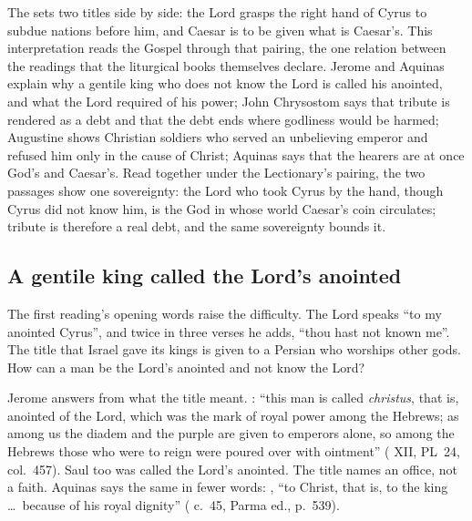 \label{sec:cyrus-and-caesar}

The  sets two titles side by side: the Lord grasps the right hand of
Cyrus to subdue nations before him, and Caesar is to be given what is
Caesar's. This interpretation reads the Gospel through that pairing, the one
relation between the readings that the liturgical books themselves declare.
Jerome and Aquinas explain why a gentile king who does not know the Lord is
called his anointed, and what the Lord required of his power; John Chrysostom says that tribute is
rendered as a debt and that the debt ends where godliness would be harmed;
Augustine shows Christian soldiers who served an unbelieving emperor and
refused him only in the cause of Christ; Aquinas says that the hearers are at
once God's and Caesar's. Read together under the Lectionary's pairing, the
two passages show one sovereignty: the Lord who took Cyrus by the hand, though
Cyrus did not know him, is the God in whose world Caesar's coin circulates;
tribute is therefore a real debt, and the same sovereignty bounds it.

\subsection{A gentile king called the Lord's anointed}

The first reading's opening words raise the difficulty. The Lord speaks ``to
my anointed Cyrus'', and twice in three verses he adds, ``thou hast not known
me''. The title that Israel gave its kings is given to a Persian who worships
other gods. How can a man be the Lord's anointed and not know the Lord?

Jerome answers from what the title meant. : ``this man is called
\emph{christus}, that is, anointed of the Lord, which was the mark of royal
power among the Hebrews; as among us the diadem and the purple are given to
emperors alone, so among the Hebrews those who were to reign were poured over
with ointment'' ( XII, PL~24, col.~457). Saul too
was called the Lord's anointed. The title names an office, not a faith. Aquinas
says the same in fewer words: , ``to Christ, that is, to the king \ldots\ because of his
royal dignity'' ( c.~45, Parma ed., p.~539).

